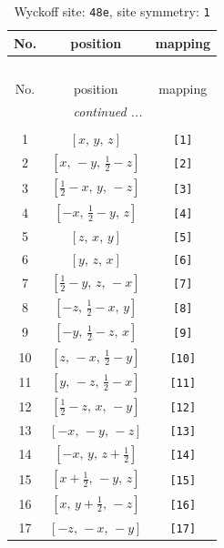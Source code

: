 \documentclass[fleqn,8pt]{jsarticle}
\begin{document}
\begin{longtable}{ccc}
\caption{Wyckoff site: {\tt 48e}, site symmetry: {\tt 1}}
 \\
 \hline \hline
No. & position & mapping \\ \hline \endfirsthead

\multicolumn{2}{l}{\tablename\ \thetable{}} \\
 \hline \hline
No. & position & mapping \\ \hline \endhead

 \hline \hline
\multicolumn{2}{r}{\footnotesize\it continued ...} \\ \endfoot

 \hline \hline
\multicolumn{2}{r}{} \\ \endlastfoot

1 & $\left[ x,\, y,\, z \right]$ & {\tt [1]} \\ \hline
2 & $\left[ x,\, - y,\, \frac{1}{2} - z \right]$ & {\tt [2]} \\ \hline
3 & $\left[ \frac{1}{2} - x,\, y,\, - z \right]$ & {\tt [3]} \\ \hline
4 & $\left[ - x,\, \frac{1}{2} - y,\, z \right]$ & {\tt [4]} \\ \hline
5 & $\left[ z,\, x,\, y \right]$ & {\tt [5]} \\ \hline
6 & $\left[ y,\, z,\, x \right]$ & {\tt [6]} \\ \hline
7 & $\left[ \frac{1}{2} - y,\, z,\, - x \right]$ & {\tt [7]} \\ \hline
8 & $\left[ - z,\, \frac{1}{2} - x,\, y \right]$ & {\tt [8]} \\ \hline
9 & $\left[ - y,\, \frac{1}{2} - z,\, x \right]$ & {\tt [9]} \\ \hline
10 & $\left[ z,\, - x,\, \frac{1}{2} - y \right]$ & {\tt [10]} \\ \hline
11 & $\left[ y,\, - z,\, \frac{1}{2} - x \right]$ & {\tt [11]} \\ \hline
12 & $\left[ \frac{1}{2} - z,\, x,\, - y \right]$ & {\tt [12]} \\ \hline
13 & $\left[ - x,\, - y,\, - z \right]$ & {\tt [13]} \\ \hline
14 & $\left[ - x,\, y,\, z + \frac{1}{2} \right]$ & {\tt [14]} \\ \hline
15 & $\left[ x + \frac{1}{2},\, - y,\, z \right]$ & {\tt [15]} \\ \hline
16 & $\left[ x,\, y + \frac{1}{2},\, - z \right]$ & {\tt [16]} \\ \hline
17 & $\left[ - z,\, - x,\, - y \right]$ & {\tt [17]} \\ \hline

\end{longtable}
\end{document}
